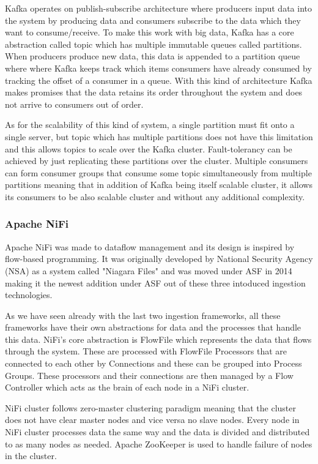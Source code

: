 Kafka operates on publish-subscribe architecture where producers input data into the system by producing data and consumers subscribe to the data which they want to consume/receive.
To make this work with big data, Kafka has a core abstraction called topic which has multiple immutable queues called partitions.
When producers produce new data, this data is appended to a partition queue where where Kafka keeps track which items consumers have already consumed by tracking the offset of a consumer in a queue.
With this kind of architecture Kafka makes promises that the data retains its order throughout the system and does not arrive to consumers out of order.

As for the scalability of this kind of system, a single partition must fit onto a single server, but topic which has multiple partitions does not have this limitation and this allows topics to scale over the Kafka cluster.
Fault-tolerancy can be achieved by just replicating these partitions over the cluster.
Multiple consumers can form consumer groups that consume some topic simultaneously from multiple partitions meaning that in addition of Kafka being itself scalable cluster, it allows its consumers to be also scalable cluster and without any additional complexity. \cite{kafka}

\subsubsection{Apache NiFi}

Apache NiFi was made to dataflow management and its design is inspired by flow-based programming.
It was originally developed by National Security Agency (NSA) as a system called "Niagara Files" and was moved under ASF in 2014 making it the newest addition under ASF out of these three intoduced ingestion technologies. \cite{bridgwater}

As we have seen already with the last two ingestion frameworks, all these frameworks have their own abstractions for data and the processes that handle this data.
NiFi's core abstraction is FlowFile which represents the data that flows through the system. 
These are processed with FlowFile Processors that are connected to each other by Connections and these can be grouped into Process Groups.
These processors and their connections are then managed by a Flow Controller which acts as the brain of each node in a NiFi cluster. \cite{nifi}

NiFi cluster follows zero-master clustering paradigm meaning that the cluster does not have clear master nodes and vice versa no slave nodes.
Every node in NiFi cluster processes data the same way and the data is divided and distributed to as many nodes as needed.
Apache ZooKeeper is used to handle failure of nodes in the cluster.\cite{nifi}

